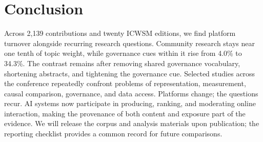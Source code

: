 \section{Conclusion}
Across 2,139 contributions and twenty ICWSM editions, we find platform turnover alongside recurring research questions. Community research stays near one tenth of topic weight, while governance cues within it rise from 4.0\% to 34.3\%. The contrast remains after removing shared governance vocabulary, shortening abstracts, and tightening the governance cue. Selected studies across the conference repeatedly confront problems of representation, measurement, causal comparison, governance, and data access. Platforms change; the questions recur. AI systems now participate in producing, ranking, and moderating online interaction, making the provenance of both content and exposure part of the evidence. We will release the corpus and analysis materials upon publication; the reporting checklist provides a common record for future comparisons.
